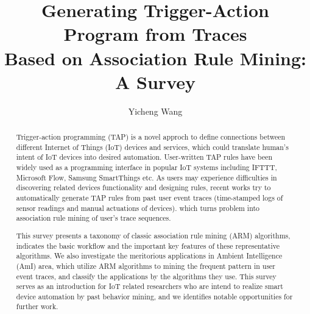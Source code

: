 \documentclass[sigplan, screen]{acmart}
\begin{document}
\title{Generating Trigger-Action Program from Traces\\Based on Association Rule Mining: A Survey}

\author{Yicheng Wang}

\renewcommand{\shortauthors}{Yicheng Wang}

\begin{abstract}
  Trigger-action programming (TAP) is a novel approch to define connections between different Internet of Things (IoT) devices and services,
  which could translate human’s intent of IoT devices into desired automation. User-written TAP rules have been widely used
  as a programming interface in popular IoT systems including IFTTT, Microsoft Flow, Samsung SmartThings etc.
  As users may experience difficulties in discovering related devices functionality and designing rules, recent works try to
  automatically generate TAP rules from past user event traces (time-stamped logs of sensor readings and manual actuations of devices).
  which turns problem into association rule mining of user's trace sequences.

  This survey presents a taxonomy of classic association rule mining (ARM) algorithms, indicates the basic workflow and the important key features of these
  representative algorithms. We also investigate the meritorious applications in Ambient Intelligence (AmI) area, which utilize ARM algorithms to mining the frequent 
  pattern in user event traces, and classify the applications by the algorithms they use. This survey serves as an introduction for IoT related researchers who 
  are intend to realize smart device automation by past behavior mining, and we identifies notable opportunities for further work.


  
\end{abstract}
\end{document}
